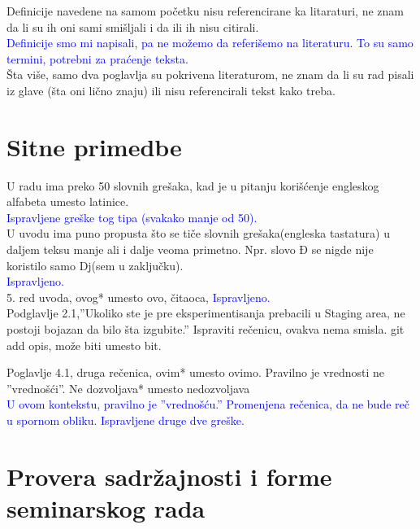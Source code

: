 \documentclass[a4paper]{report}
\newcommand{\odgovor}[1]{\textcolor{blue}{#1}}
\begin{document}
Definicije navedene na samom početku nisu referencirane ka litaraturi, ne znam da li su ih oni sami smišljali i da ili ih nisu citirali. \\
\odgovor{Definicije smo mi napisali, pa ne možemo da referišemo na literaturu. To su samo termini, potrebni za praćenje teksta.}\\
Šta više, samo dva poglavlja su pokrivena literaturom, ne znam da li su rad pisali iz glave (šta oni lično znaju) ili nisu referencirali tekst kako treba. \\

\section{Sitne primedbe}
U radu ima preko 50 slovnih grešaka, kad je u pitanju korišćenje engleskog alfabeta umesto latinice.\\
\odgovor{Ispravljene greške tog tipa (svakako manje od 50).}\\
U uvodu ima puno propusta što se tiče slovnih grešaka(engleska tastatura) u daljem teksu manje ali i dalje veoma primetno. Npr. slovo Đ se nigde nije koristilo samo Dj(sem u zaključku).\\
\odgovor{Ispravljeno.}\\
5. red uvoda, ovog* umesto ovo, čitaoca,\newline
\odgovor{Ispravljeno.}\\
Podglavlje 2.1,''Ukoliko ste je pre eksperimentisanja prebacili u Staging area, ne postoji bojazan da bilo šta izgubite.'' Ispraviti rečenicu, ovakva nema smisla.\newline
git add opis, može biti umesto bit.\newline

Poglavlje 4.1, druga rečenica, ovim* umesto ovimo. Pravilno je vrednosti ne ''vrednošći''. Ne dozvoljava* umesto nedozvoljava\\
\odgovor{U ovom kontekstu, pravilno je ''vrednošću.'' Promenjena rečenica, da ne bude reč u spornom obliku. Ispravljene druge dve greške.}\\



\section{Provera sadržajnosti i forme seminarskog rada}
\end{document}
